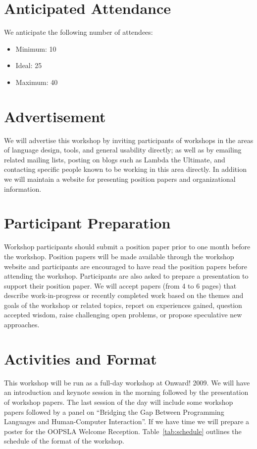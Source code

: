 \documentclass{acm_proc_article-sp}
\begin{document}
\section{Anticipated Attendance}

We anticipate the following number of attendees:

\begin{itemize}
\item Minimum: 10 
\item Ideal: 25 
\item Maximum: 40 
\end{itemize}

\section{Advertisement}

We will advertise this workshop by inviting participants of workshops
in the areas of language design, tools, and general usability
directly; as well as by emailing related mailing lists, posting on
blogs such as Lambda the Ultimate, and contacting specific people
known to be working in this area directly. In addition we will
maintain a website for presenting position papers and organizational
information.

\section{Participant Preparation}

Workshop participants should submit a position paper prior to one
month before the workshop. Position papers will be made available
through the workshop website and participants are encouraged to have
read the position papers before attending the workshop. Participants
are also asked to prepare a presentation to support their position
paper. We will accept papers (from 4 to 6 pages) that describe
work-in-progress or recently completed work based on the themes and
goals of the workshop or related topics, report on experiences gained,
question accepted wisdom, raise challenging open problems, or propose
speculative new approaches.

\section{Activities and Format}

This workshop will be run as a full-day workshop at Onward! 2009.  We
will have an introduction and keynote session in the morning followed
by the presentation of workshop papers.  The last session of the day
will include some workshop papers followed by a panel on ``Bridging
the Gap Between Programming Languages and Human-Computer
Interaction''. If we have time we will prepare a poster for the
OOPSLA Welcome Reception.  Table~\ref{tab:schedule} outlines the
schedule of the format of the workshop.
\end{document}
